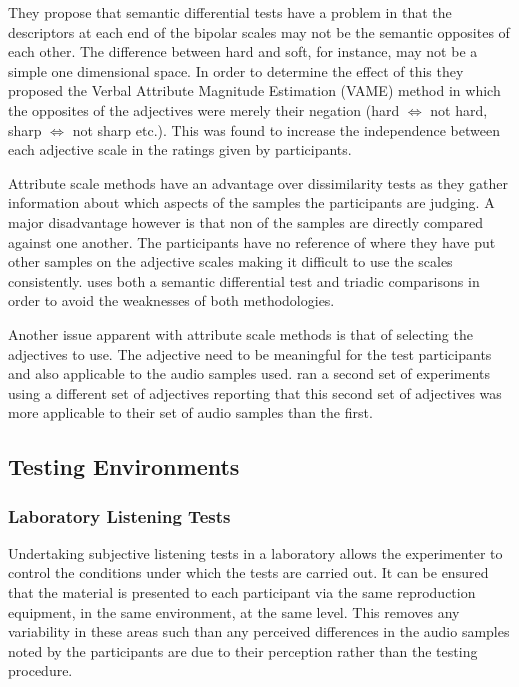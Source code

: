 			They propose that semantic differential tests have a problem in that the descriptors at each end of
			the bipolar scales may not be the semantic opposites of each other. The difference between hard and
			soft, for instance, may not be a simple one dimensional space. In order to determine the effect of
			this they proposed the Verbal Attribute Magnitude Estimation (VAME) method in which the opposites of
			the adjectives were merely their negation (hard $\Leftrightarrow$ not hard, sharp $\Leftrightarrow$
			not sharp etc.). This was found to increase the independence between each adjective scale in the
			ratings given by participants. 

			Attribute scale methods have an advantage over dissimilarity tests as they gather information about
			which aspects of the samples the participants are judging. A major disadvantage however is that non
			of the samples are directly compared against one another. The participants have no reference of
			where they have put other samples on the adjective scales making it difficult to use the scales
			consistently. \citet{marui2005constructing} uses both a semantic differential test and triadic
			comparisons in order to avoid the weaknesses of both methodologies. 
			
			Another issue apparent with attribute scale methods is that of selecting the adjectives to use. The
			adjective need to be meaningful for the test participants and also applicable to the audio samples
			used. \citet{kendall1993verbal2} ran a second set of experiments using a different set of
			adjectives reporting that this second set of adjectives was more applicable to their set of audio
			samples than the first.

	\subsection{Testing Environments}
	\label{sec:Timbre-ListeningTests-Environments}

		\subsubsection*{Laboratory Listening Tests}
			Undertaking subjective listening tests in a laboratory allows the experimenter to control the
			conditions under which the tests are carried out. It can be ensured that the material is presented
			to each participant via the same reproduction equipment, in the same environment, at the same level.
			This removes any variability in these areas such than any perceived differences in the audio samples
			noted by the participants are due to their perception rather than the testing procedure.


